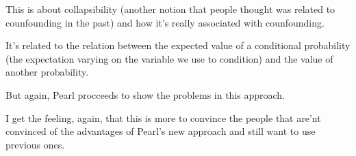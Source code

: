 This is about collapsibility (another notion that people thought was related to counfounding in the past) and how it's really associated with counfounding.

It's related to the relation between the expected value of a conditional probability (the expectation varying on the variable we use to condition) and the value of another probability.

But again, Pearl procceeds to show the problems in this approach.

I get the feeling, again, that this is more to convince the people that are'nt convinced of the advantages of Pearl's new approach and still want to use previous ones.
